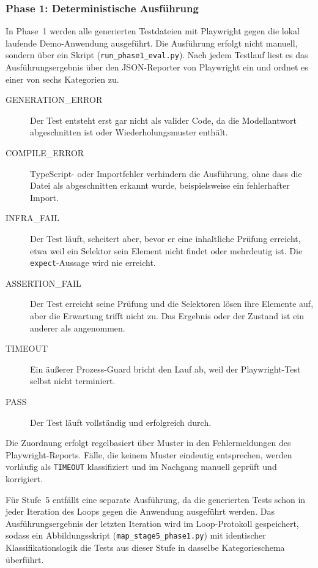 \subsubsection{Phase 1: Deterministische Ausführung}

In Phase~1 werden alle generierten Testdateien mit Playwright gegen die lokal laufende Demo-Anwendung ausgeführt. Die Ausführung erfolgt nicht manuell, sondern über ein Skript (\texttt{run\_phase1\_eval.py}). Nach jedem Testlauf liest es das Ausführungsergebnis über den \ac{JSON}-Reporter von Playwright ein und ordnet es einer von sechs Kategorien zu.

\begin{description}
    \item[GENERATION\_ERROR] Der Test entsteht erst gar nicht als valider Code, da die Modellantwort abgeschnitten ist oder Wiederholungsmuster enthält.
    \item[COMPILE\_ERROR] TypeScript- oder Importfehler verhindern die Ausführung, ohne dass die Datei als abgeschnitten erkannt wurde, beispielsweise ein fehlerhafter Import.
    \item[INFRA\_FAIL] Der Test läuft, scheitert aber, bevor er eine inhaltliche Prüfung erreicht, etwa weil ein Selektor sein Element nicht findet oder mehrdeutig ist. Die \texttt{expect}-Aussage wird nie erreicht.
    \item[ASSERTION\_FAIL] Der Test erreicht seine Prüfung und die Selektoren lösen ihre Elemente auf, aber die Erwartung trifft nicht zu. Das Ergebnis oder der Zustand ist ein anderer als angenommen.
    \item[TIMEOUT] Ein äußerer Prozess-Guard bricht den Lauf ab, weil der Playwright-Test selbst nicht terminiert.
    \item[PASS] Der Test läuft vollständig und erfolgreich durch.
\end{description}

Die Zuordnung erfolgt regelbasiert über Muster in den Fehlermeldungen des Playwright-Reports. Fälle, die keinem Muster eindeutig entsprechen, werden vorläufig als \texttt{TIMEOUT} klassifiziert und im Nachgang manuell geprüft und korrigiert.

Für Stufe~5 entfällt eine separate Ausführung, da die generierten Tests schon in jeder Iteration des Loops gegen die Anwendung ausgeführt werden. Das Ausführungsergebnis der letzten Iteration wird im Loop-Protokoll gespeichert, sodass ein Abbildungsskript (\texttt{map\_stage5\_phase1.py}) mit identischer Klassifikationslogik die Tests aus dieser Stufe in dasselbe Kategorieschema überführt.

